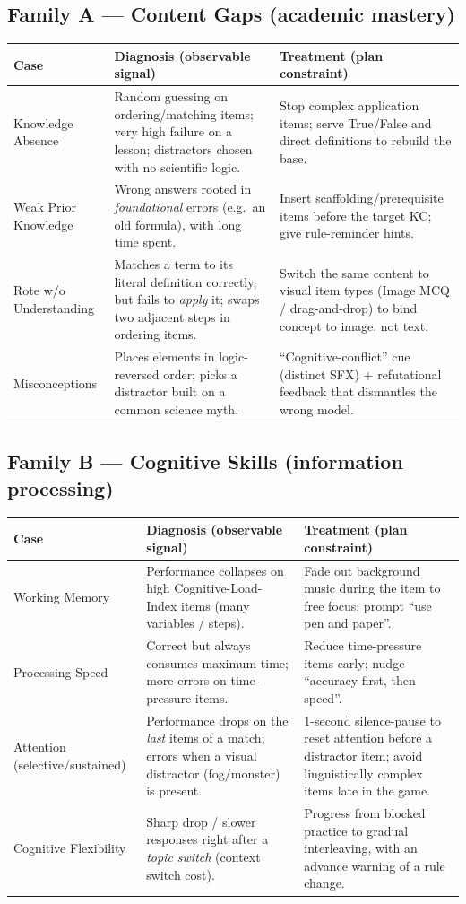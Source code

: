 \documentclass[11pt]{article}
\begin{document}
\subsection{Family A --- Content Gaps (academic mastery)}
\begin{tabularx}{\textwidth}{@{}p{3.6cm}YY@{}}
\toprule
\textbf{Case} & \textbf{Diagnosis (observable signal)} & \textbf{Treatment (plan constraint)}\\
\midrule
Knowledge Absence & Random guessing on ordering/matching items; very high failure on a lesson; distractors chosen with no scientific logic. & Stop complex application items; serve True/False and direct definitions to rebuild the base.\\
Weak Prior Knowledge & Wrong answers rooted in \emph{foundational} errors (e.g.\ an old formula), with long time spent. & Insert scaffolding/prerequisite items before the target KC; give rule-reminder hints.\\
Rote w/o Understanding & Matches a term to its literal definition correctly, but fails to \emph{apply} it; swaps two adjacent steps in ordering items. & Switch the same content to visual item types (Image MCQ / drag-and-drop) to bind concept to image, not text.\\
Misconceptions & Places elements in logic-reversed order; picks a distractor built on a common science myth. & ``Cognitive-conflict'' cue (distinct SFX) + refutational feedback that dismantles the wrong model.\\
\bottomrule
\end{tabularx}

\subsection{Family B --- Cognitive Skills (information processing)}
\begin{tabularx}{\textwidth}{@{}p{3.6cm}YY@{}}
\toprule
\textbf{Case} & \textbf{Diagnosis (observable signal)} & \textbf{Treatment (plan constraint)}\\
\midrule
Working Memory & Performance collapses on high Cognitive-Load-Index items (many variables / steps). & Fade out background music during the item to free focus; prompt ``use pen and paper''.\\
Processing Speed & Correct but always consumes maximum time; more errors on time-pressure items. & Reduce time-pressure items early; nudge ``accuracy first, then speed''.\\
Attention (selective/sustained) & Performance drops on the \emph{last} items of a match; errors when a visual distractor (fog/monster) is present. & 1-second silence-pause to reset attention before a distractor item; avoid linguistically complex items late in the game.\\
Cognitive Flexibility & Sharp drop / slower responses right after a \emph{topic switch} (context switch cost). & Progress from blocked practice to gradual interleaving, with an advance warning of a rule change.\\
\bottomrule
\end{tabularx}
\end{document}
